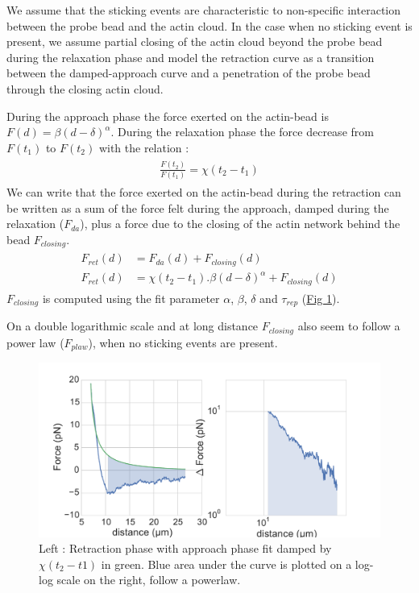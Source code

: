 \documentclass[A4paperpaper,11pt,english]{sphinxmanual}
\begin{document}
We assume that the sticking events are characteristic to non-specific interaction
between the probe bead and the actin cloud.  In the case when no sticking event
is present, we assume partial closing of the actin cloud beyond the
probe bead during the relaxation phase and model the retraction curve as a
transition between the damped-approach curve and a penetration of the probe
bead through the closing actin cloud.

During the approach phase the force exerted on the actin-bead is
\(F(d)=\beta(d-\delta)^\alpha\). During the relaxation phase the force
decrease from \(F(t_1)\) to \(F(t_2)\) with the relation :
\label{index-latex:equation-eqa311}\begin{gather}
\begin{split}\frac{F(t_2)}{F(t_1)} = \chi(t_2-t_1)\end{split}\label{index-latex-eqa311}
\end{gather}
We can write that the force exerted on the actin-bead during the retraction can
be written as a sum of the force felt during the approach, damped during the
relaxation (\(F_{da}\)), plus a force due to the closing of the actin
network behind the bead \(F_{closing}\).
\label{index-latex:equation-eqa312}\begin{gather}
\begin{split}F_{ret}(d) &= F_{da}(d) + F_{closing}(d)\\
F_{ret}(d) &= \chi(t_2-t_1).\beta(d-\delta)^\alpha+ F_{closing}(d)\end{split}\label{index-latex-eqa312}
\end{gather}
\(F_{closing}\) is computed using the fit parameter \(\alpha\), \(\beta\), \(\delta\) and \(\tau_{rep}\) (\hyperref[index-latex:retract-powerlaw]{Fig  \ref*{index-latex:retract-powerlaw}}).

On a double logarithmic scale and at long distance \(F_{closing}\) also seem to
follow a power law (\(F_{plaw}\)), when no sticking events are present.
\begin{figure}[htbp]
\centering
\capstart

\includegraphics[width=1.000\linewidth]{retract-powerlaw.pdf}
\caption{Left : Retraction phase with approach phase fit damped by
\(\chi(t_2-t1)\) in green. Blue area under the curve is plotted on a
log-log scale on the right, follow a powerlaw.}\label{index-latex:retract-powerlaw}\end{figure}
\end{document}
